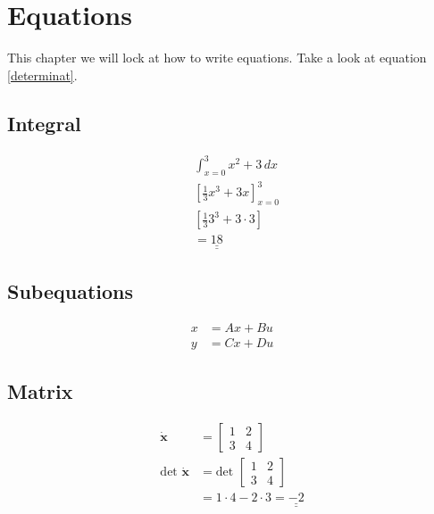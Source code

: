 \chapter{Equations}

This chapter we will lock at how to write equations. Take a look at equation \ref{determinat}.

\section{Integral}
\begin{align}
    &\int_{x=0}^3 x^2 + 3  \, dx\   \\
    &\left[\frac{1}{3}x^3 + 3x\right]_{x=0}^3 \\
    &\left[\frac{1}{3}3^3 + 3\cdot3\right] \\
    &= \underline{\underline{18}}
\end{align}

\section{Subequations}
\begin{subequations}
\begin{align}
    x&=Ax + Bu \\
    y&=Cx + Du
\end{align}
\end{subequations}

\section{Matrix}


\begin{align}
	\dot{\mathbf{x}} &= 
	\begin{bmatrix}
	1 & 2 \\
    3 & 4
	\end{bmatrix} \\
     \text{det } \dot{\mathbf{x}} &= \text{det } \begin{bmatrix}
       1 & 2 \\
        3 & 4  
     \end{bmatrix}\label{determinat}\\ 
     &= 1\cdot4 - 2\cdot3 = \underline{\underline{-2}}
\end{align}

